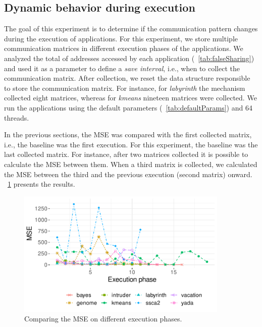 \subsection{Dynamic behavior during execution}\label{sec:dynamicBehavior}

The goal of this experiment is to determine if the communication pattern changes during the execution of applications. For this experiment, we store multiple communication matrices in different execution phases of the applications. We analyzed the total of addresses accessed by each application (\tablename~\ref{tab:falseSharing}) and used it as a parameter to define a \emph{save interval}, i.e., when to collect the communication matrix. After collection, we reset the data structure responsible to store the communication matrix. For instance, for \emph{labyrinth} the mechanism collected eight matrices, whereas for \emph{kmeans} nineteen matrices were collected.  We run the applications using the default parameters (\tablename~\ref{tab:defaultParams}) and 64 threads.

In the previous sections, the MSE was compared with the first collected matrix, i.e., the baseline was the first execution. For this experiment, the baseline was the last collected matrix. For instance, after two matrices collected it is possible to calculate the MSE between them. When a third matrix is collected, we calculated the MSE between the third and the previous execution (second matrix) onward. \figurename~\ref{fig:dynamicBehavior} presents the results.

\begin{figure}[!t]
	\centering
	\includegraphics[width=0.9\textwidth]{figures/sharingBehavior/FourthQ/dynamic.pdf}
	\caption{Comparing the MSE on different execution phases.}
	\label{fig:dynamicBehavior}
\end{figure}

